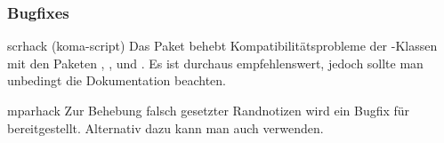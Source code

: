 \subsubsection{Bugfixes}
\begin{packages}
\item[scrhack](koma-script)
  Das Paket behebt Kompatibilitätsprobleme der \KOMAScript-Klassen mit den 
  Paketen , ,  und
  . Es ist durchaus empfehlenswert, jedoch sollte man 
  unbedingt die Dokumentation beachten.
\item[mparhack]
  Zur Behebung falsch gesetzter Randnotizen wird ein Bugfix für 
   bereitgestellt. Alternativ dazu kann man auch 
   verwenden.
\end{packages}
